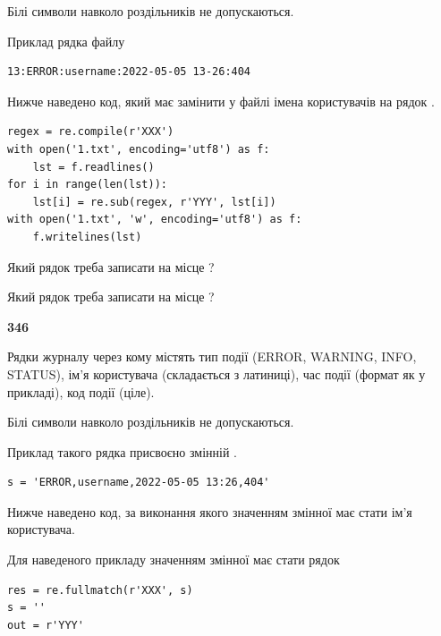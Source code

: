 Білі символи навколо роздільників не допускаються.

Приклад рядка файлу



\begin{verbatim}
13:ERROR:username:2022-05-05 13-26:404
\end{verbatim}


Нижче наведено код, який має замінити у файлі імена користувачів на рядок .



\begin{verbatim}
regex = re.compile(r'XXX')
with open('1.txt', encoding='utf8') as f:
    lst = f.readlines()
for i in range(len(lst)):
    lst[i] = re.sub(regex, r'YYY', lst[i])
with open('1.txt', 'w', encoding='utf8') as f:
    f.writelines(lst)
\end{verbatim}







Який рядок треба записати на місце  ?\par
\vspace{5mm}


Який рядок треба записати на місце  ?\par


\newpage

{\begin {center}\textbf{ 346}\end {center}}\par
Рядки журналу через кому містять тип події (ERROR, WARNING, INFO, STATUS), ім'я користувача (складається з латиниці), час події (фор\-мат як у прикладі), код події (ціле).

Білі символи навколо роздільників не допускаються.

Приклад такого рядка присвоєно змінній .



\begin{verbatim}
s = 'ERROR,username,2022-05-05 13:26,404'
\end{verbatim}


Нижче наведено код, за виконання якого значенням змінної  має стати ім'я користувача.

Для наведеного прикладу значенням змінної  має стати рядок 



\begin{verbatim}
res = re.fullmatch(r'XXX', s)
s = ''
out = r'YYY'
\end{verbatim}


